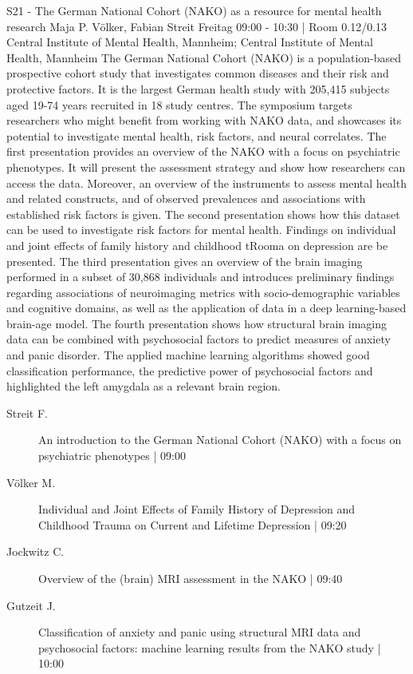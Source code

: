 
            \begin{symposium}
            {S21 - The German National Cohort (NAKO) as a resource for mental health research}
            {Maja P. Völker, Fabian Streit}
            {Freitag 09:00 - 10:30 | Room 0.12/0.13}
            {Central Institute of Mental Health, Mannheim; Central Institute of Mental Health, Mannheim}
            The German National Cohort (NAKO) is a population-based prospective cohort study that investigates common diseases and their risk and protective factors. It is the largest German health study with 205,415 subjects aged 19-74 years recruited in 18 study centres. The symposium targets researchers who might benefit from working with NAKO data, and showcases its potential to investigate mental health, risk factors, and neural correlates. The first presentation provides an overview of the NAKO with a focus on psychiatric phenotypes. It will present the assessment strategy and show how researchers can access the data. Moreover, an overview of the instruments to assess mental health and related constructs, and of observed prevalences and associations with established risk factors is given. The second presentation shows how this dataset can be used to investigate risk factors for mental health. Findings on individual and joint effects of family history and childhood tRooma on depression are be presented. The third presentation gives an overview of the brain imaging performed in a subset of 30,868 individuals and introduces preliminary findings regarding associations of neuroimaging metrics with socio-demographic variables and cognitive domains, as well as the application of data in a deep learning-based brain-age model. The fourth presentation shows how structural brain imaging data can be combined with psychosocial factors to predict measures of anxiety and panic disorder. The applied machine learning algorithms showed good classification performance, the predictive power of psychosocial factors and highlighted the left amygdala as a relevant brain region.
            \begin{description}    
            
                \item [ Streit F.] An introduction to the German National Cohort (NAKO) with a focus on psychiatric phenotypes \textcolor{mygray}{ | 09:00}    
                
                \item [ Völker M.] Individual and Joint Effects of Family History of Depression and Childhood Trauma on Current and Lifetime Depression \textcolor{mygray}{ | 09:20}    
                
                \item [ Jockwitz C.] Overview of the (brain) MRI assessment in the NAKO \textcolor{mygray}{ | 09:40}    
                
                \item [ Gutzeit J.] Classification of anxiety and panic using structural MRI data and psychosocial factors: machine learning results from the NAKO study \textcolor{mygray}{ | 10:00}    
                
            \end{description} 
            \end{symposium}
            